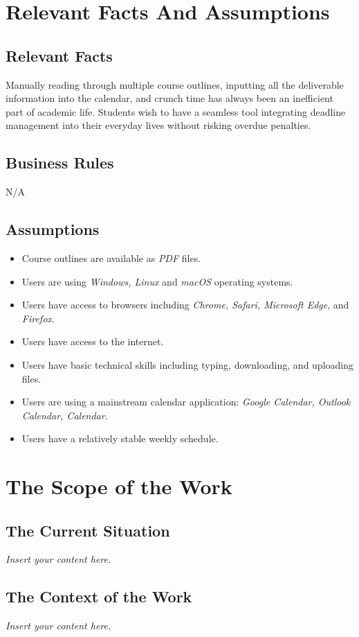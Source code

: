 \documentclass[12pt]{article}
\newcommand{\lips}{\textit{Insert your content here.}}
\begin{document}
\section{Relevant Facts And Assumptions}
\subsection{Relevant Facts}
Manually reading through multiple course outlines, inputting all the deliverable information into the calendar, and crunch time has always been an inefficient part of academic life. Students wish to have a seamless tool integrating deadline management into their everyday lives without risking overdue penalties.
\subsection{Business Rules}
N/A
\subsection{Assumptions}
\begin{itemize}
    \item Course outlines are available as \textit{PDF} files.
    \item Users are using \textit{Windows, Linux} and \textit{macOS} operating systems.
    \item Users have access to browsers including \textit{Chrome, Safari, Microsoft Edge}, and \textit{Firefox}.
    \item Users have access to the internet.
    \item Users have basic technical skills including typing, downloading, and uploading files.
    \item Users are using a mainstream calendar application: \textit{Google Calendar, Outlook Calendar, Calendar}.
    \item Users have a relatively stable weekly schedule.
\end{itemize}


\section{The Scope of the Work}
\subsection{The Current Situation}
\lips
\subsection{The Context of the Work}
\lips
\end{document}
